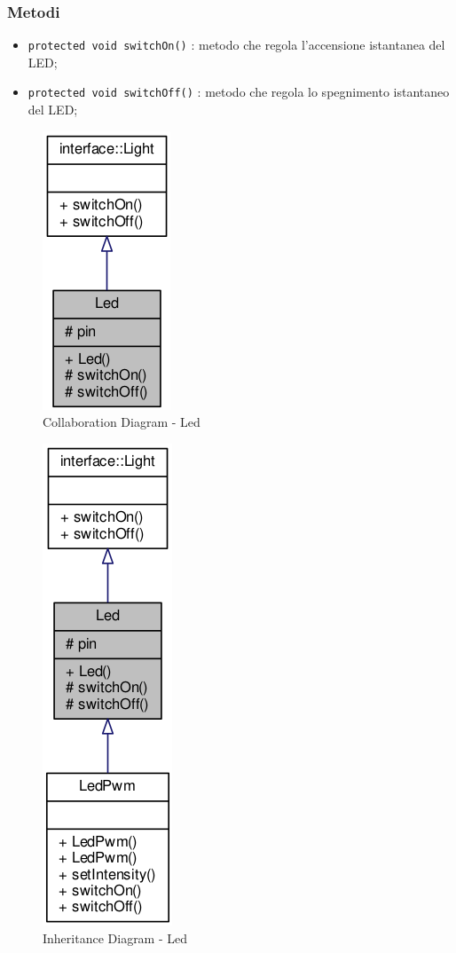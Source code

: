 \subsubsection{Metodi}
\begin{itemize}
	\item \texttt{protected	void switchOn()} : metodo che regola l'accensione istantanea del LED;
	\item \texttt{protected	void switchOff()} : metodo che regola lo spegnimento istantaneo del LED;
\end{itemize}
\begin{figure}[!ht]
	\centering
	\includegraphics[scale=.5]{img/UML/CollaborationDiagram/Led.png}
	\caption{Collaboration Diagram - Led}
\end{figure}
\begin{figure}[!ht]
	\centering
	\includegraphics[scale=.5]{img/UML/InheritanceDiagram/Led.png}
	\caption{Inheritance Diagram - Led}
\end{figure}

